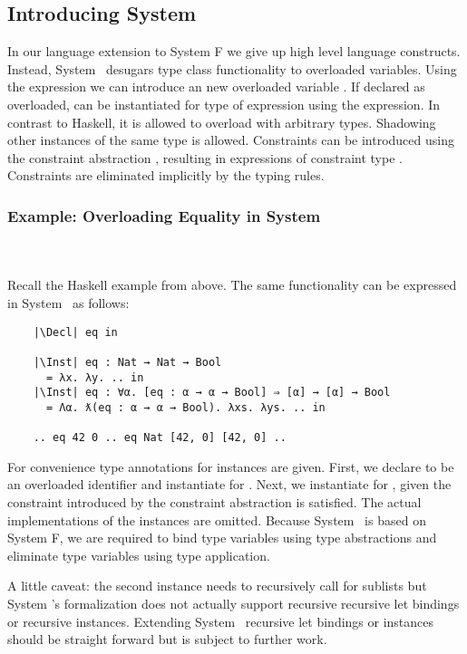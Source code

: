 \subsection{Introducing System \Fo}
In our language extension to System F we give up high level language constructs. 
Instead, System \Fo\ desugars type class functionality to overloaded variables. 
Using the  expression we can introduce an new overloaded variable . 
If declared as overloaded,  can be instantiated for type  of expression  using the  expression.
In contrast to Haskell, it is allowed to overload  with arbitrary types. 
Shadowing other instances of the same type is allowed.
Constraints can be introduced using the constraint abstraction , resulting in expressions of constraint type . 
Constraints are eliminated implicitly by the typing rules.

\subsubsection{Example: Overloading Equality in System \Fo}\hfill\\\\
Recall the Haskell example from above. The same functionality can be expressed in System \Fo\ as follows: 
\begin{verbatim}
    |\Decl| eq in

    |\Inst| eq : Nat → Nat → Bool 
      = λx. λy. .. in
    |\Inst| eq : ∀α. [eq : α → α → Bool] ⇒ [α] → [α] → Bool 
      = Λα. ƛ(eq : α → α → Bool). λxs. λys. .. in

    .. eq 42 0 .. eq Nat [42, 0] [42, 0] .. 
\end{verbatim}
For convenience type annotations for instances are given. 
First, we declare  to be an overloaded identifier and instantiate  for . 
Next, we instantiate  for \inl{[α]}, given the constraint introduced by the constraint abstraction  is satisfied.  
The actual implementations of the instances are omitted.
Because System \Fo\ is based on System F, we are required to bind type variables using type abstractions  and eliminate type variables using type application. 

\noindent A little caveat: the second instance needs to recursively call  for sublists but System \Fo's formalization does not actually support recursive recursive let bindings or recursive instances. Extending System \Fo\ recursive let bindings or instances should be straight forward but is subject to further work.

